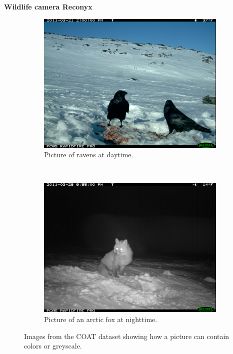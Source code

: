 \documentclass[USenglish]{uit-thesis}
\begin{document}
\textbf{Wildlife camera Reconyx}

\begin{figure}[t!]
    \centering
    \begin{subfigure}[t]{0.45\textwidth}
        \includegraphics[width=\textwidth]{IMG_0040.JPG}
        \caption{Picture of ravens at daytime.}
    \end{subfigure}%
    ~ 
    \begin{subfigure}[t]{0.45\textwidth}
        \includegraphics[width=\textwidth]{IMG_1562.JPG}
        \caption{Picture of an arctic fox at nighttime.}
    \end{subfigure}
    \caption{Images from the COAT dataset showing how a picture can contain colors or greyscale.}
    \label{fig:pictures}
\end{figure}
\end{document}
